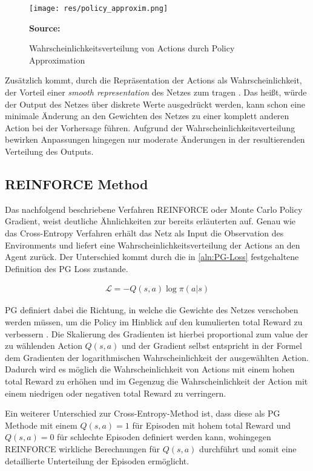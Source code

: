 \documentclass[11pt]{scrartcl}
\newcommand{\source}[1]{\vspace{-5pt} \caption*{\hfill \textbf{Source:} {#1}} }
\begin{document}
\begin{figure}[htp]
\centering
\texttt{[image: res/policy\_approxim.png]}
\caption{Wahrscheinlichkeitsverteilung von Actions durch Policy Approximation}
\source{\cite[~S.243 - Chapter 9 - Figure 1]{L2018}}
\label{fig:prob-dist-pg}
\end{figure}

Zusätzlich kommt, durch die Repräsentation der Actions als Wahrscheinlichkeit, der Vorteil einer
\textit{smooth representation} des Netzes zum tragen \cite[~S.243]{L2018}. 
Das heißt, würde der Output des Netzes über diskrete Werte ausgedrückt werden, kann schon eine
minimale Änderung an den Gewichten des Netzes zu einer komplett anderen Action bei der
Vorhersage führen. Aufgrund der Wahrscheinlichkeitsverteilung bewirken Anpassungen hingegen
nur moderate Änderungen in der resultierenden Verteilung des Outputs.


\subsection{REINFORCE Method}
Das nachfolgend beschriebene Verfahren REINFORCE oder Monte Carlo Policy Gradient, weist
deutliche Ähnlichkeiten zur bereits erläuterten  auf.
Genau wie das Cross-Entropy Verfahren erhält das Netz als Input die Observation des
Environments und liefert eine Wahrscheinlichkeitsverteilung der Actions an den Agent
zurück. Der Unterschied kommt durch die in \autoref{aln:PG-Loss} festgehaltene Definition
des PG Loss zustande.

\begin{align}
\mathcal{L}=-Q(s,a)\log\pi(a|s)
\label{aln:PG-Loss}
\end{align}

PG definiert dabei die Richtung, in welche die Gewichte des Netzes verschoben werden müssen,
um die Policy im Hinblick auf den kumulierten total Reward zu verbessern \cite[~S.244]{L2018}.
Die Skalierung des Gradienten ist hierbei proportional zum value der zu wählenden Action
$Q(s,a)$ und der Gradient selbst entspricht in der Formel dem Gradienten der logarithmischen
Wahrscheinlichkeit der ausgewählten Action. Dadurch wird es möglich die Wahrscheinlichkeit
von Actions mit einem hohen total Reward zu erhöhen und im Gegenzug die Wahrscheinlichkeit
der Action mit einem niedrigen oder negativen total Reward zu verringern.

Ein weiterer Unterschied zur Cross-Entropy-Method ist, dass diese als PG Methode mit einem
$Q(s,a)=1$ für Episoden mit hohem total Reward und $Q(s,a)=0$ für schlechte Episoden
definiert werden kann, wohingegen REINFORCE wirkliche Berechnungen für $Q(s,a)$ durchführt
und somit eine detaillierte Unterteilung der Episoden ermöglicht.
\end{document}
